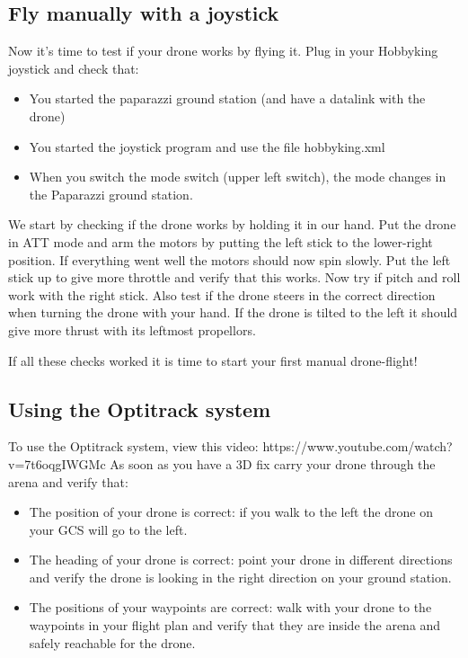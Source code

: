 \documentclass{article}
\begin{document}
\subsection*{Fly manually with a joystick }
Now it's time to test if your drone works by flying it. Plug in your Hobbyking joystick and check that:
\begin{itemize}
\item You started the paparazzi ground station (and have a datalink with the drone)
\item You started the joystick program and use the file hobbyking.xml
\item When you switch the mode switch (upper left switch), the mode changes in the Paparazzi ground station.
\end{itemize}

We start by checking if the drone works by holding it in our hand. Put the drone in ATT mode and arm the motors by putting the left stick to the lower-right position. If everything went well the motors should now spin slowly. Put the left stick up to give more throttle and verify that this works. Now try if pitch and roll work with the right stick. 
Also test if the drone steers in the correct direction when turning the drone with your hand. If the drone is tilted to the left it should give more thrust with its leftmost propellors. 

If all these checks worked it is time to start your first manual drone-flight! 

\subsection*{Using the Optitrack system}
To use the Optitrack system, view this video: https://www.youtube.com/watch?v=7t6oqgIWGMc
As soon as you have a 3D fix carry your drone through the arena and verify that:
\begin{itemize}
\item The position of your drone is correct: if you walk to the left the drone on your GCS will go to the left.
\item The heading of your drone is correct: point your drone in different directions and verify the drone is looking in the right direction on your ground station.
\item The positions of your waypoints are correct: walk with your drone to the waypoints in your flight plan and verify that they are inside the arena and safely reachable for the drone. 
\end{itemize}
\end{document}
